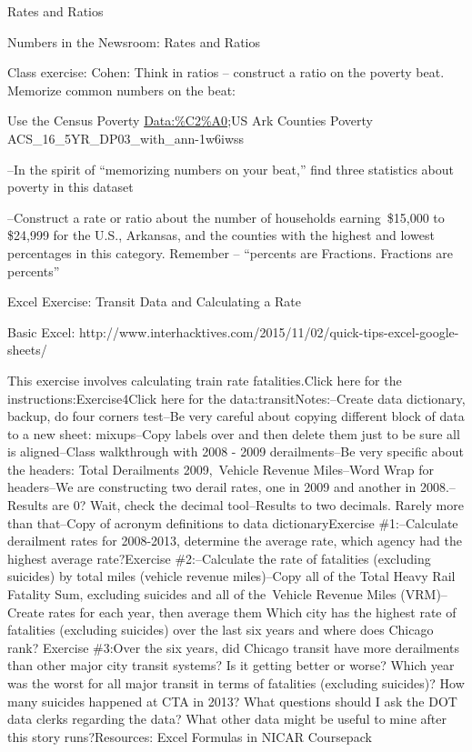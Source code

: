 \documentclass[]{book}
\begin{document}
Rates and Ratios

Numbers in the Newsroom: Rates and Ratios

Class exercise: Cohen: Think in ratios -- construct a ratio on the poverty beat. Memorize common numbers on the beat:

Use the Census Poverty \url{Data:\%C2\%A0};US Ark Counties Poverty ACS\_16\_5YR\_DP03\_with\_ann-1w6iwss

--In the spirit of ``memorizing numbers on your beat,'' find three statistics about poverty in this dataset

--Construct a rate or ratio about the number of households earning~\$15,000 to \$24,999 for the U.S., Arkansas, and the counties with the highest and lowest percentages in this category. Remember -- ``percents are Fractions. Fractions are percents''

Excel Exercise: Transit Data and Calculating a Rate

Basic Excel: http://www.interhacktives.com/2015/11/02/quick-tips-excel-google-sheets/

This exercise involves calculating train rate fatalities.Click here for the instructions:Exercise4Click here for the data:transitNotes:--Create data dictionary, backup, do four corners test--Be very careful about copying different block of data to a new sheet: mixups--Copy labels over and then delete them just to be sure all is aligned--Class walkthrough with 2008 - 2009 derailments--Be very specific about the headers: Total Derailments 2009,~Vehicle Revenue Miles--Word Wrap for headers--We are constructing two derail rates, one in 2009 and another in 2008.--Results are 0? Wait, check the decimal tool--Results to two decimals. Rarely more than that--Copy of acronym definitions to data dictionaryExercise \#1:--Calculate derailment rates for 2008-2013, determine the average rate, which agency had the highest average rate?Exercise \#2:--Calculate the rate of fatalities (excluding suicides) by total miles (vehicle revenue miles)--Copy all of the Total Heavy Rail Fatality Sum, excluding suicides and all of the~Vehicle Revenue Miles (VRM)--Create rates for each year, then average them Which city has the highest rate of fatalities (excluding suicides) over the last six years and where does Chicago rank? Exercise \#3:Over the six years, did Chicago transit have more derailments than other major city transit systems? Is it getting better or worse? Which year was the worst for all major transit in terms of fatalities (excluding suicides)? How many suicides happened at CTA in 2013? What questions should I ask the DOT data clerks regarding the data? What other data might be useful to mine after this story runs?Resources: Excel Formulas in NICAR Coursepack
\end{document}
